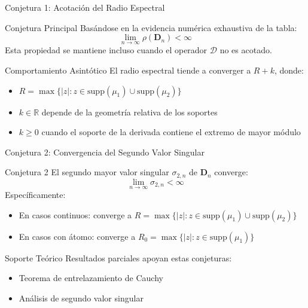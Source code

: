 \begin{frame}{Conjetura 1: Acotación del Radio Espectral}
	\begin{block}{Conjetura Principal} \small
		Basándose en la evidencia numérica exhaustiva de la tabla:
		$$\lim_{n \to \infty} \rho(\mathbf{D}_n) < \infty$$
		Esta propiedad se mantiene incluso cuando el operador $\mathcal{D}$ no es acotado.
	\end{block}
	\pause
	\begin{block}{Comportamiento Asintótico} \small
		El radio espectral tiende a converger a $R + k$, donde:
		\begin{itemize}
			\item $R = \max\{|z| : z \in \text{supp}(\mu_1) \cup \text{supp}(\mu_2)\}$
			\item $k \in \mathbb{R}$ depende de la geometría relativa de los soportes
			\item $k \geq 0$ cuando el soporte de la derivada contiene el extremo de mayor módulo
		\end{itemize}
	\end{block}
\end{frame}

\begin{frame}{Conjetura 2: Convergencia del Segundo Valor Singular}
	\begin{block}{Conjetura 2} \small
		El segundo mayor valor singular $\sigma_{2,n}$ de $\mathbf{D}_n$ converge:
		$$\lim_{n \to \infty} \sigma_{2,n} < \infty$$
		Específicamente:
		\begin{itemize}
			\item En casos continuos: converge a $R = \max\{|z| : z \in \text{supp}(\mu_1) \cup \text{supp}(\mu_2)\}$
			\item En casos con átomo: converge a $R_0 = \max\{|z| : z \in \text{supp}(\mu_1)\}$
		\end{itemize}
	\end{block}
	\pause
	\begin{block}{Soporte Teórico} \small
		Resultados parciales apoyan estas conjeturas:
		\begin{itemize}
			\item Teorema de entrelazamiento de Cauchy \cite{Bhatia1997}
			\item Análisis de segundo valor singular \cite{singularValuesOfHessenbergMatrices}
		\end{itemize}
	\end{block}
\end{frame}

